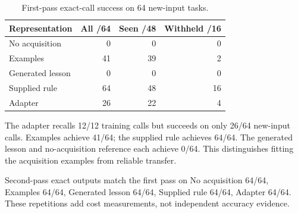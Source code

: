 \begin{table}[H]

\centering

\begin{tabular}{lrrr}

\toprule

Representation & All /64 & Seen /48 & Withheld /16 \\

\midrule

No acquisition & 0 & 0 & 0 \\

Examples & 41 & 39 & 2 \\

Generated lesson & 0 & 0 & 0 \\

Supplied rule & 64 & 48 & 16 \\

Adapter & 26 & 22 & 4 \\

\bottomrule

\end{tabular}

\caption{First-pass exact-call success on 64 new-input tasks.}

\end{table}

The adapter recalls 12/12 training calls but succeeds on only 26/64 new-input calls. Examples achieve 41/64; the supplied rule achieves 64/64. The generated lesson and no-acquisition reference each achieve 0/64. This distinguishes fitting the acquisition examples from reliable transfer.

Second-pass exact outputs match the first pass on No acquisition 64/64, Examples 64/64, Generated lesson 64/64, Supplied rule 64/64, Adapter 64/64. These repetitions add cost measurements, not independent accuracy evidence.

